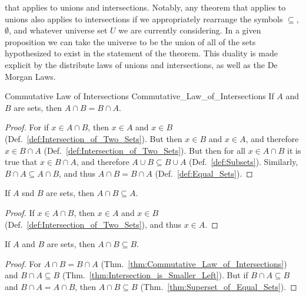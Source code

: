         that applies to unions and intersections.
        Notably, any theorem that applies to unions also applies to
        intersections if we appropriately rearrange the symbols $\subseteq$,
        $\emptyset$, and whatever universe set $U$ we are currently considering.
        In a given proposition we can take the universe to be the union of all
        of the sets hypothesized to exist in the statement of the theorem. This
        duality is made explicit by the distribute laws of unions and
        intersections, as well as the De Morgan Laws.
        \begin{ltheorem}{Commutative Law of Intersections}
                        {Commutative_Law_of_Intersections}
            If $A$ and $B$ are sets, then $A\cap{B}=B\cap{A}$.
        \end{ltheorem}
        \begin{proof}
            For if $x\in{A}\cap{B}$, then $x\in{A}$ and $x\in{B}$
            (Def.~\ref{def:Intersection_of_Two_Sets}). But then $x\in{B}$ and
            $x\in{A}$, and therefore $x\in{B}\cap{A}$
            (Def.~\ref{def:Intersection_of_Two_Sets}). But then for all
            $x\in{A}\cap{B}$ it is true that $x\in{B}\cap{A}$, and therefore
            $A\cup{B}\subseteq{B}\cup{A}$ (Def.~\ref{def:Subsets}). Similarly,
            $B\cap{A}\subseteq{A}\cap{B}$, and thus $A\cap{B}=B\cap{A}$
            (Def.~\ref{def:Equal_Sets}).
        \end{proof}
        \begin{theorem}
            \label{thm:Intersection_is_Smaller_Left}%
            If $A$ snd $B$ are sets, then $A\cap{B}\subseteq{A}$.
        \end{theorem}
        \begin{proof}
            If $x\in{A}\cap{B}$, then $x\in{A}$ and $x\in{B}$
            (Def.~\ref{def:Intersection_of_Two_Sets}), and thus $x\in{A}$.
        \end{proof}
        \begin{theorem}
            \label{thm:Intersection_is_Smaller_Right}%
            If $A$ and $B$ are sets, then $A\cap{B}\subseteq{B}$.
        \end{theorem}
        \begin{proof}
            For $A\cap{B}=B\cap{A}$
            (Thm.~\ref{thm:Commutative_Law_of_Intersections}) and
            $B\cap{A}\subseteq{B}$
            (Thm.~\ref{thm:Intersection_is_Smaller_Left}). But if
            $B\cap{A}\subseteq{B}$ and $B\cap{A}=A\cap{B}$, then
            $A\cap{B}\subseteq{B}$ (Thm.~\ref{thm:Superset_of_Equal_Sets}).
        \end{proof}

